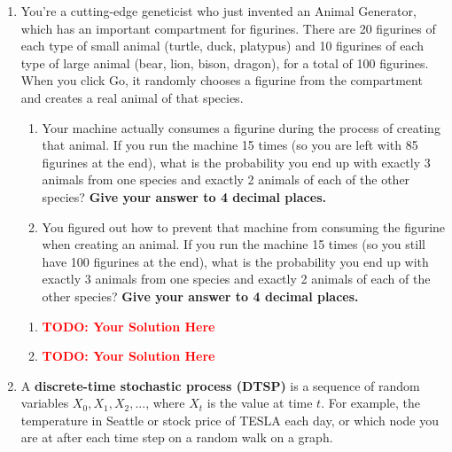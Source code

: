 \documentclass[12pt]{article}
\def\todo#1{\textcolor{red}{\textbf{#1}}}
\renewcommand{\|}{\mid}
\begin{document}
\begin{enumerate}
\item You’re a cutting-edge geneticist who just invented an Animal Generator, which has an important compartment for figurines. There are 20 figurines of each type of small animal (turtle, duck, platypus) and 10 figurines of each type of large animal (bear, lion, bison, dragon), for a total of 100 figurines.  When you click Go, it randomly chooses a figurine from the compartment and creates a real animal of that species. 
\begin{enumerate}
    \item Your machine actually consumes a figurine during the process of creating that animal. If you run the machine 15 times (so you are left with 85 figurines at the end), what is the probability you end up with exactly 3 animals from one species and exactly 2 animals of each of the other species? \textbf{Give your answer to 4 decimal places.}
    \item You figured out how to prevent that machine from consuming the figurine when creating an animal. If you run the machine 15 times (so you still have 100 figurines at the end), what is the probability you end up with exactly 3 animals from one species and exactly 2 animals of each of the other species? \textbf{Give your answer to 4 decimal places.}
\end{enumerate}
\begin{tcolorbox}
\begin{enumerate}
\item \todo{TODO: Your Solution Here}
\item \todo{TODO: Your Solution Here}
\end{enumerate}
\end{tcolorbox}


\pagebreak

\item A \textbf{discrete-time stochastic process (DTSP)} is a sequence of random variables $X_0,X_1,X_2,...$, where $X_t$ is the value at time $t$. For example, the temperature in Seattle or stock price of TESLA each day, or which node you are at after each time step on a random walk on a graph. 


\end{enumerate}
\end{document}
